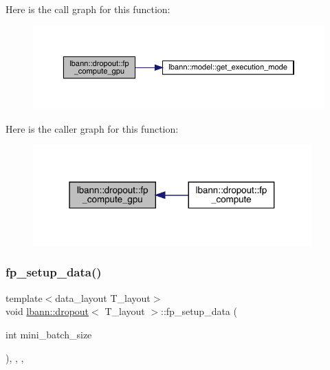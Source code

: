 Here is the call graph for this function\+:\nopagebreak
\begin{figure}[H]
\begin{center}
\leavevmode
\includegraphics[width=350pt]{classlbann_1_1dropout_ad71de4282d2164171bbcad158a7bf1e7_cgraph}
\end{center}
\end{figure}
Here is the caller graph for this function\+:\nopagebreak
\begin{figure}[H]
\begin{center}
\leavevmode
\includegraphics[width=304pt]{classlbann_1_1dropout_ad71de4282d2164171bbcad158a7bf1e7_icgraph}
\end{center}
\end{figure}
\mbox{\label{classlbann_1_1dropout_a478368964f515f5456324b6504a5358f}} 
\subsubsection{\texorpdfstring{fp\+\_\+setup\+\_\+data()}{fp\_setup\_data()}}
{\footnotesize\ttfamily template$<$data\+\_\+layout T\+\_\+layout$>$ \\
void \hyperlink{classlbann_1_1dropout}{lbann\+::dropout}$<$ T\+\_\+layout $>$\+::fp\+\_\+setup\+\_\+data (\begin{DoxyParamCaption}\item[{int}]{mini\+\_\+batch\+\_\+size }\end{DoxyParamCaption})\hspace{0.3cm}{\ttfamily [inline]}, {\ttfamily [override]}, {\ttfamily [private]}, {\ttfamily [virtual]}}

